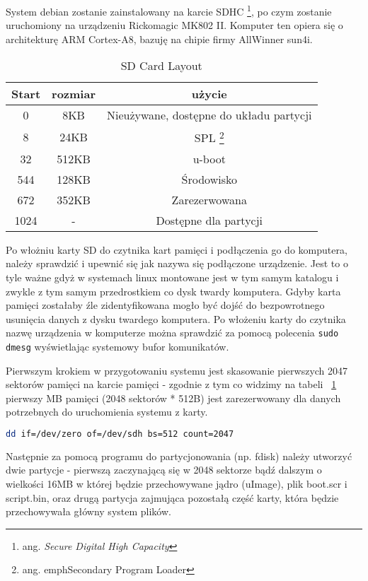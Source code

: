 System debian zostanie zainstalowany na karcie SDHC \footnote{ang. \em{Secure Digital High Capacity}}, po czym zostanie uruchomiony na urządzeniu Rickomagic MK802 II. Komputer ten opiera się o architekturę ARM Cortex-A8, bazuję na chipie firmy AllWinner sun4i.
\par
	\begin{table}[t]
		\centering
		\caption{SD Card Layout}
		\label{tab:sd-layout}
	\begin{tabular}{|c|c|c|}
	\hline
	\textbf{Start} & \textbf{rozmiar} & \textbf{użycie} \\ 
	\hline
	0 & 8KB & Nieużywane, dostępne do układu partycji \\
	\hline
	8 & 24KB & SPL \footnote{ang. emph{Secondary Program Loader}} \\
	\hline
	32 & 512KB & u-boot \\
	\hline
	544 & 128KB & Środowisko \\
	\hline
	672 & 352KB & Zarezerwowana \\
	\hline
	1024 & - & Dostępne dla partycji \\
	\hline
	
	
\end{tabular}
\end{table}

\par
Po włożniu karty SD do czytnika kart pamięci i podłączenia go do komputera, należy sprawdzić i upewnić się jak nazywa się podłączone urządzenie. Jest to o tyle ważne gdyż w systemach linux montowane jest w tym samym katalogu i zwykle z tym samym przedrostkiem co dysk twardy komputera. Gdyby karta pamięci zostałaby źle zidentyfikowana mogło być dojść do bezpowrotnego usunięcia danych z dysku twardego komputera. Po włożeniu karty do czytnika nazwę urządzenia w komputerze można sprawdzić za pomocą polecenia \lstinline|sudo dmesg| wyświetlając systemowy bufor komunikatów. 
\par
Pierwszym krokiem w przygotowaniu systemu jest skasowanie pierwszych 2047 sektorów pamięci na karcie pamięci - zgodnie z tym co widzimy na tabeli ~\ref{tab:sd-layout} pierwszy MB pamięci (2048 sektorów * 512B) jest zarezerwowany dla danych potrzebnych do uruchomienia systemu z karty.
\par
\begin{lstlisting}[language=bash]
dd if=/dev/zero of=/dev/sdh bs=512 count=2047
\end{lstlisting}
\par
Następnie za pomocą programu do partycjonowania (np. fdisk) należy utworzyć dwie partycje - pierwszą zaczynającą się w 2048 sektorze bądź dalszym o wielkości 16MB w której będzie przechowywane jądro (uImage), plik boot.scr i script.bin, oraz drugą partycja zajmująca pozostałą część karty, która będzie przechowywała główny system plików.
\par

